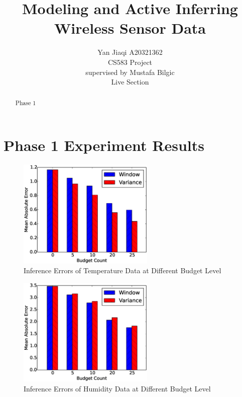 \documentclass[12pt]{article}  %
\title{Modeling and Active Inferring Wireless Sensor Data}
\author{Yan Jiaqi A20321362\\
CS583 Project\\
supervised by
Mustafa Bilgic\\
Live Section
}
\theoremstyle{definition}
\theoremstyle{remark}
\begin{document}
\maketitle

\begin{abstract}
Phase 1
\end{abstract}

\newpage
\tableofcontents

\newpage
\section{Phase 1 Experiment Results}
\label{sec:des}

\begin{figure}[h]
\centering
        \includegraphics[width=0.58\textwidth]{../phase1/temperature_err}
\caption{Inference Errors of Temperature Data at Different Budget Level}
\label{fig:phase1:temperature}
\end{figure}

\begin{figure}[h]
\centering
        \includegraphics[width=0.58\textwidth]{../phase1/humidity_err}
\caption{Inference Errors of Humidity Data at Different Budget Level}
\label{fig:phase1:humidity}
\end{figure}
\end{document}
